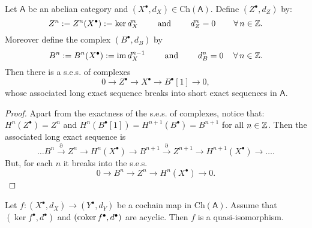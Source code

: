 \begin{lem}
	Let $\mathsf{A}$ be an abelian category and $\left( X^{\bullet}, d_{X} \right) \in \mathrm{Ch}(\mathsf{A})$.
	Define $\left( Z^{\bullet}, d_{Z} \right)$ by:
	\begin{equation}
		Z^n := Z^n(X^\bullet) := \ker d_X^n \qquad \text{ and } \qquad
		d^n_{Z} = 0 \qquad \,\forall\, n \in \mathbb{Z}
	.\end{equation} 
	Moreover define the complex $\left( B^{\bullet}, d_{B} \right)$ by
	\begin{equation}
		B^n := B^n(X^\bullet) := \operatorname{im} d_X^{n-1} \qquad \text{ and } \qquad
		d^n_{B} = 0 \quad \,\forall\, n \in \mathbb{Z}
	.\end{equation} 
	Then there is a s.e.s. of complexes
	\begin{equation}
	0\to Z^\bullet \to X^\bullet \to
	B^\bullet[1] \to 0
	,\end{equation} 
	whose associated long exact sequence breaks into short exact sequences in $\mathsf{A}$.
\end{lem} 
\begin{proof}
	Apart from the exactness of the s.e.s. of complexes, notice that:
	$H^n(Z^\bullet) = Z^n$ and $H^n(B^\bullet[1]) = H^{n+1}(B^\bullet) = B^{n+1}$ for all $n \in \mathbb{Z}$.
	Then the associated long exact sequence is
	\begin{equation}
		\ldots B^n \xrightarrow{\partial} Z^n \to H^n(X^\bullet) \to B^{n+1} \xrightarrow{\partial}
		Z^{n+1} \to H^{n+1}(X^\bullet) \to \ldots
	.\end{equation} 
	But, for each $n$ it breaks into the s.e.s.
	\begin{equation}
		0 \to B^n \to Z^n \to H^n(X^\bullet) \to 0
	.\end{equation} 
\end{proof}

\begin{lem}
	Let $f: \left( X^{\bullet}, d_{X} \right) \to \left( Y^{\bullet}, d_{Y} \right)$ be a cochain map in $\mathrm{Ch}(\mathsf{A})$.
	Assume that $\left(\ker f^\bullet, d^\bullet\right)$ and $\left(\operatorname{coker} f^\bullet, d^\bullet\right)$
	are acyclic.
	Then $f$ is a quasi-isomorphism.
\end{lem} 

